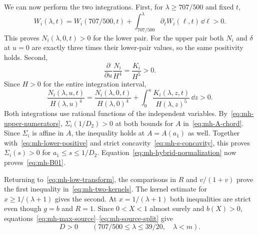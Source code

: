 We can now perform the two integrations. First, for $\lambda\ge707/500$ and fixed $t$,
\[
 W_i(\lambda,t)=W_i(707/500,t)+
       \int_{707/500}^{\lambda}\partial_\ell W_i(\ell,t)\,\dd\ell>0.
\]
This proves $N_i(\lambda,0,t)>0$ for the lower pair. For the upper pair both $N_i$ and $\delta$ at $u=0$ are exactly three times their lower-pair values, so the same positivity holds.
Second,
\[
 \frac{\partial}{\partial u}\frac{N_i}{H^4}=\frac{K_i}{H^5}>0.
\]
Since $H>0$ for the entire integration interval,
\[
 \frac{N_i(\lambda,u,t)}{H(\lambda,u)^4}
 =\frac{N_i(\lambda,0,t)}{H(\lambda,0)^4}
  +\int_0^u\frac{K_i(\lambda,z,t)}{H(\lambda,z)^5}\,\dd z>0.
\]
Both integrations use rational functions of the independent variables. By~\eqref{eq:mh-upper-numerators}, $\Sigma_i(1/D_2)>0$ at both bounds for $A$ in~\eqref{eq:mh-A-chord}. Since $\Sigma_i$ is affine in $A$, the inequality holds at $A=A(a_1)$ as well. Together with~\eqref{eq:mh-lower-positive} and strict concavity~\eqref{eq:mh-s-concavity}, this proves $\Sigma_i(s)>0$ for $a_1\le s\le1/D_2$. Equation~\eqref{eq:mh-hybrid-normalization} now proves~\eqref{eq:mh-B01}.

Returning to~\eqref{eq:mh-low-transform}, the comparisons in $R$ and $v/(1+v)$ prove the first inequality in~\eqref{eq:mh-two-kernels}. The kernel estimate for $x\ge1/(\lambda+1)$ gives the second. At $x=1/(\lambda+1)$ both inequalities are strict even though $g=b$ and $R=1$. Since $0<X<1$ almost surely and $b(X)>0$, equations~\eqref{eq:mh-max-source}--\eqref{eq:mh-source-split} give
\begin{equation}\label{eq:mh-middle-conclusion}
 D>0\qquad\left(707/500\le\lambda\le39/20,\quad\lambda<m\right).
\end{equation}
